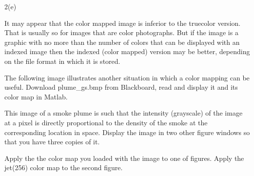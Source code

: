 \documentclass[11pt]{article}
\begin{document}
    2(e)

It may appear that the color mapped image is inferior to the truecolor
version. That is usually so for images that are color photographs. But
if the image is a graphic with no more than the number of colors that
can be displayed with an indexed image then the indexed (color mapped)
version may be better, depending on the file format in which it is
stored.

The following image illustrates another situation in which a color
mapping can be useful. Download plume\_gs.bmp from Blackboard, read and
display it and its color map in Matlab.

This image of a smoke plume is such that the intensity (grayscale) of
the image at a pixel is directly proportional to the density of the
smoke at the corresponding location in space. Display the image in two
other figure windows so that you have three copies of it.

Apply the the color map you loaded with the image to one of figures.
Apply the jet(256) color map to the second figure.
\end{document}
